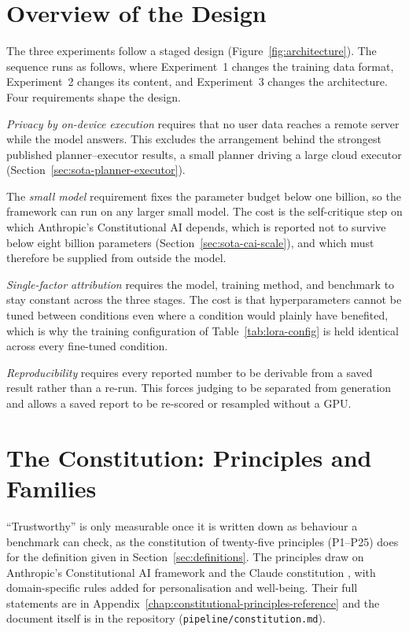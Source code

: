 \section{Overview of the Design}
\label{sec:mr-overview}
\label{sec:OverviewOfDesign}

The three experiments follow a staged design (Figure~\ref{fig:architecture}). The sequence runs as follows, where Experiment~1 changes the training data format, Experiment~2 changes its content, and Experiment~3 changes the architecture. Four requirements shape the design.

\emph{Privacy by on-device execution} requires that no user data reaches a remote server while the model answers. This excludes the arrangement behind the strongest published planner--executor results, a small planner driving a large cloud executor (Section~\ref{sec:sota-planner-executor}).

The \emph{small model} requirement fixes the parameter budget below one billion, so the framework can run on any larger small model. The cost is the self-critique step on which Anthropic's Constitutional AI depends, which is reported not to survive below eight billion parameters (Section~\ref{sec:sota-cai-scale}), and which must therefore be supplied from outside the model.

\emph{Single-factor attribution} requires the model, training method, and benchmark to stay constant across the three stages. The cost is that hyperparameters cannot be tuned between conditions even where a condition would plainly have benefited, which is why the training configuration of Table~\ref{tab:lora-config} is held identical across every fine-tuned condition.

\emph{Reproducibility} requires every reported number to be derivable from a saved result rather than a re-run. This forces judging to be separated from generation and allows a saved report to be re-scored or resampled without a GPU.

\section{The Constitution: Principles and Families}
\label{subsec:mr-constitution}

``Trustworthy'' is only measurable once it is written down as behaviour a benchmark can check, as the constitution of twenty-five principles (P1--P25) does for the definition given in Section~\ref{sec:definitions}. The principles draw on Anthropic's Constitutional AI framework \cite{bai2022constitutionalaiharmlessnessai} and the Claude constitution \cite{anthropic2023claudesconstitution}, with domain-specific rules added for personalisation and well-being. Their full statements are in Appendix~\ref{chap:constitutional-principles-reference} and the document itself is in the repository (\texttt{pipeline/constitution.md}).

